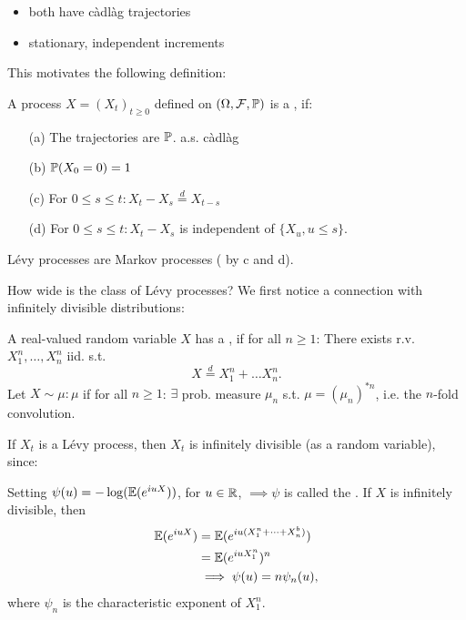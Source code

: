 \begin{itemize}
    \item both have càdlàg trajectories
    \item stationary, independent increments
\end{itemize}

This motivates the following definition:

\begin{definition}\label{def:4.1}
    A process $X=(X_t)_{t\geq 0}$ defined on $(\Omega,\mathcal{F},\mathbb{P})$ is a , if:
    \begin{enumerate}
        \item[(a)] The trajectories are $\mathbb{P}$. a.s. càdlàg 
        \item[(b)] $\mathbb{P}(X_0=0)=1$
        \item[(c)] For $0\leq s\leq t: X_t-X_s\stackrel{d}{=}X_{t-s}$
        \item[(d)] For $0\leq s\leq t: X_t-X_s$ is independent of $\{X_u,u\leq s\}$.    
    \end{enumerate}
\end{definition}

\begin{remark}
    Lévy processes are Markov processes ( by c and d).
\end{remark}

How wide is the class of Lévy processes? We first notice a connection with infinitely divisible distributions:

\begin{definition}\label{def:4.2}
    A real-valued random variable $X$ has a , if 
    for all $n\geq 1$: There exists r.v. $X_1^n,\dots,X_n^n$ iid. s.t. \[X\stackrel{d}{=}X_1^n+\dots X_n^n.\] 
    Let $X\sim \mu: \mu$  if for all $n\geq 1$:
    $\exists$ prob. measure $\mu_n$ s.t. $\mu=(\mu_n)^{*n}$, i.e. the $n$-fold convolution. 
\end{definition}

If $X_t$ is a Lévy process, then $X_t$ is infinitely divisible (as a random variable), since:

\begin{remark}
    Setting $\psi(u)=-\log(\mathbb{E}(e^{iuX}))$, for $u\in \mathbb{R}$, $\implies \psi$ is called the .
    If $X$ is infinitely divisible, then 
    \begin{align*}
        \mathbb{E}(e^{iuX})&=\mathbb{E}(e^{iu(X_1^n+\dots+X_n^b)})\\
        &=\mathbb{E}(e^{iuX_1^n})^n \\
        &\implies \psi(u)=n\psi_n(u),
    \end{align*} 
    where $\psi_n$ is the characteristic exponent of $X_1^n$.
\end{remark}

